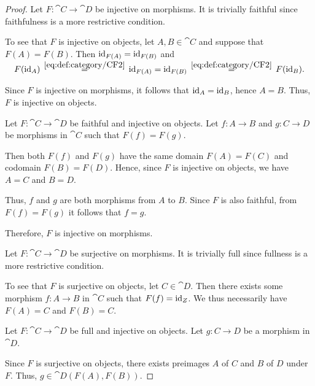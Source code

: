 \begin{proof}
  \SufficiencySubProof* Let \( F: \cat{C} \to \cat{D} \) be injective on morphisms. It is trivially faithful since faithfulness is a more restrictive condition.

  To see that \( F \) is injective on objects, let \( A, B \in \cat{C} \) and suppose that \( F(A) = F(B) \). Then \( \operatorname{id}_{F(A)} = \operatorname{id}_{F(B)} \) and
  \begin{equation*}
    F(\id_A)
    \reloset {\eqref{eq:def:category/CF2}} =
    \id_{F(A)}
    =
    \id_{F(B)}
    \reloset {\eqref{eq:def:category/CF2}} =
    F(\id_B).
  \end{equation*}

  Since \( F \) is injective on morphisms, it follows that \( \operatorname{id}_A = \operatorname{id}_B \), hence \( A = B \). Thus, \( F \) is injective on objects.

  \NecessitySubProof* Let \( F: \cat{C} \to \cat{D} \) be faithful and injective on objects. Let \( f: A \to B \) and \( g: C \to D \) be morphisms in \( \cat{C} \) such that \( F(f) = F(g) \).

  Then both \( F(f) \) and \( F(g) \) have the same domain \( F(A) = F(C) \) and codomain \( F(B) = F(D) \). Hence, since \( F \) is injective on objects, we have \( A = C \) and \( B = D \).

  Thus, \( f \) and \( g \) are both morphisms from \( A \) to \( B \). Since \( F \) is also faithful, from \( F(f) = F(g) \) it follows that \( f = g \).

  Therefore, \( F \) is injective on morphisms.

  \SufficiencySubProof* Let \( F: \cat{C} \to \cat{D} \) be surjective on morphisms. It is trivially full since fullness is a more restrictive condition.

  To see that \( F \) is surjective on objects, let \( C \in \cat{D} \). Then there exists some morphism \( f: A \to B \) in \( \cat{C} \) such that \( F(f) = \operatorname{id}_Z \). We thus necessarily have \( F(A) = C \) and \( F(B) = C \).

  \NecessitySubProof* Let \( F: \cat{C} \to \cat{D} \) be full and injective on objects. Let \( g: C \to D \) be a morphism in \( \cat{D} \).

  Since \( F \) is surjective on objects, there exists preimages \( A \) of \( C \) and \( B \) of \( D \) under \( F \). Thus, \( g \in \cat{D}(F(A), F(B)) \).


\end{proof}
